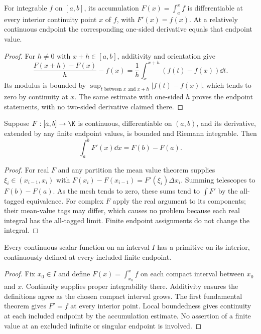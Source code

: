 \begin{theorem}
For integrable $f$ on $[a,b]$, its accumulation $F(x)=\int_a^xf$
is differentiable at every interior continuity point $x$ of $f$, with
$F'(x)=f(x)$. At a relatively continuous endpoint the corresponding
one-sided derivative equals that endpoint value.
\end{theorem}
\begin{proof}
For $h\ne0$ with $x+h\in[a,b]$, additivity and orientation give
\[\frac{F(x+h)-F(x)}h-f(x)=\frac1h\int_x^{x+h}(f(t)-f(x))\dd t.
\]
Its modulus is bounded by
$\sup_{t\text{ between }x\text{ and }x+h}|f(t)-f(x)|$, which tends to
zero by continuity at $x$. The same estimate with one-sided $h$ proves
the endpoint statements, with no two-sided derivative claimed there.
\end{proof}

\begin{theorem}
Suppose $F:[a,b]\to\K$ is continuous, differentiable on $(a,b)$,
and its derivative, extended by any finite endpoint values, is bounded
and Riemann integrable. Then
\[\int_a^bF'(x)\dd x=F(b)-F(a).
\]
\end{theorem}
\begin{proof}
For real $F$ and any partition the mean value theorem supplies
$\xi_i\in(x_{i-1},x_i)$ with
$F(x_i)-F(x_{i-1})=F'(\xi_i)\Delta x_i$. Summing telescopes to
$F(b)-F(a)$. As the mesh tends to zero, these sums tend to $\int F'$
by the all-tagged equivalence. For complex $F$ apply the real argument
to its components; their mean-value tags may differ, which causes no
problem because each real integral has the all-tagged limit.
Finite endpoint assignments do not change the integral.
\end{proof}

\begin{theorem}
Every continuous scalar function on an interval $I$ has a primitive on
its interior, continuously defined at every included finite endpoint.
\end{theorem}
\begin{proof}
Fix $x_0\in I$ and define $F(x)=\int_{x_0}^xf$ on each compact
interval between $x_0$ and $x$. Continuity supplies proper integrability
there. Additivity ensures the definitions agree as the chosen compact
interval grows. The first fundamental theorem gives $F'=f$ at every
interior point. Local boundedness gives continuity at each included
endpoint by the accumulation estimate. No assertion of a finite value
at an excluded infinite or singular endpoint is involved.
\end{proof}

